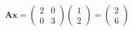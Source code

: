 \begin{equation}
	\bm{Ax}=
	\begin{pmatrix}
		2 & 0 \\
		0 & 3
	\end{pmatrix}
	\begin{pmatrix}
		1 \\
		2
	\end{pmatrix}
	=
	\begin{pmatrix}
		2 \\
		6
	\end{pmatrix}
\end{equation}
